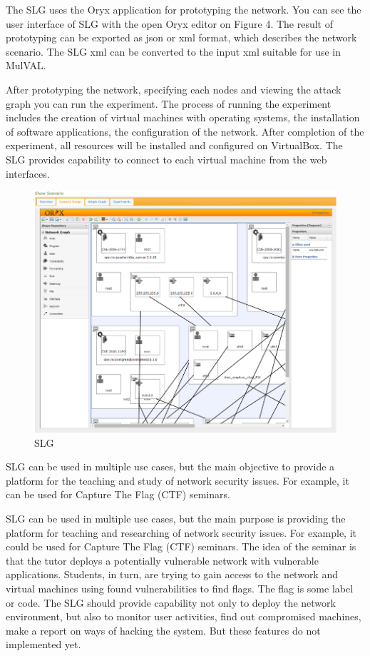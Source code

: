 The SLG uses the Oryx application for prototyping the network. You can see the user interface of SLG with the open Oryx editor on Figure 4. The result of prototyping can be exported as json or xml format, which describes the network scenario. The SLG xml can be converted to the input xml suitable for use in MulVAL. 

After prototyping the network, specifying each nodes and viewing the attack graph you can run the experiment. The process of running the experiment includes the creation of virtual machines with operating systems, the installation of software applications, the configuration of the network. After completion of the experiment, all resources will be installed and configured on VirtualBox. The SLG provides capability to connect to each virtual machine from the web interfaces. 

\begin{figure}[ht!]
\centering
\includegraphics[width=\textwidth]{slg.png}
\caption{SLG}
\label{overflow}
\end{figure}
SLG can be used in multiple use cases, but the main objective to provide a platform for the teaching and study of network security issues. For example, it can be used for Capture The Flag (CTF) seminars.


SLG can be used in multiple use cases, but the main purpose is providing the platform for teaching and researching of network security issues. For example, it could be used for Capture The Flag (CTF) seminars. The idea of the seminar is that the tutor deploys a potentially vulnerable network with vulnerable applications. Students, in turn, are trying to gain access to the network and virtual machines using found vulnerabilities to find flags. The flag is some label or code. The SLG should provide capability not only to deploy the network environment, but also to monitor user activities, find out compromised machines, make a report on ways of hacking the system. But these features do not implemented yet. 
  
